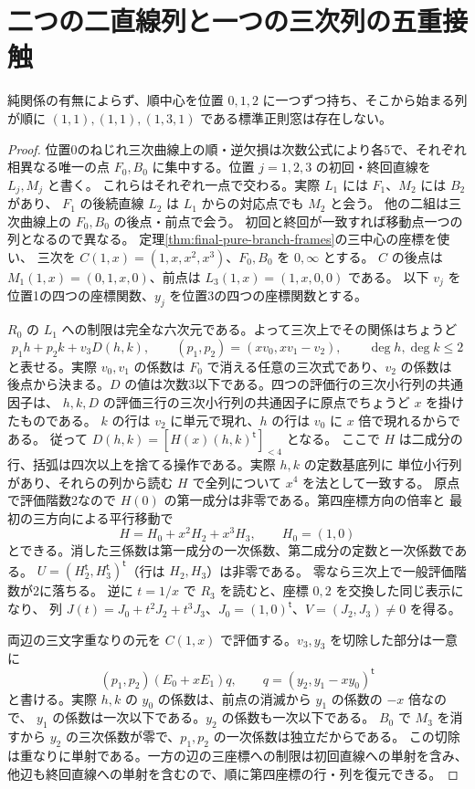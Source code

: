 \section{二つの二直線列と一つの三次列の五重接触}
\label{sec:cubic-corridor-jets}
\begin{theorem}\label{thm:cubic-corridor-jets}
純関係の有無によらず、順中心を位置 $0,1,2$ に一つずつ持ち、そこから始まる列が順に
$(1,1),(1,1),(1,3,1)$ である標準正則窓は存在しない。
\end{theorem}
\begin{proof}
位置0のねじれ三次曲線上の順・逆欠損は次数公式により各5で、それぞれ相異なる唯一の点
$F_0,B_0$ に集中する。位置 $j=1,2,3$ の初回・終回直線を $L_j,M_j$ と書く。
これらはそれぞれ一点で交わる。実際 $L_1$ には $F_1$、$M_2$ には $B_2$ があり、
$F_1$ の後続直線 $L_2$ は $L_1$ からの対応点でも $M_2$ と会う。
他の二組は三次曲線上の $F_0,B_0$ の後点・前点で会う。
初回と終回が一致すれば移動点一つの列となるので異なる。
定理\ref{thm:final-pure-branch-frames}の三中心の座標を使い、
三次を $C(1,x)=(1,x,x^2,x^3)$、$F_0,B_0$ を $0,\infty$ とする。
$C$ の後点は $M_1(1,x)=(0,1,x,0)$、前点は $L_3(1,x)=(1,x,0,0)$ である。
以下 $v_j$ を位置1の四つの座標関数、$y_j$ を位置3の四つの座標関数とする。

$R_0$ の $L_1$ への制限は完全な六次元である。よって三次上でその関係はちょうど
\[
 p_1h+p_2k+v_3D(h,k),\qquad
 (p_1,p_2)=(xv_0,xv_1-v_2),\qquad \deg h,\deg k\le2
\]
と表せる。実際 $v_0,v_1$ の係数は $F_0$ で消える任意の三次式であり、$v_2$ の係数は
後点から決まる。$D$ の値は次数3以下である。四つの評価行の三次小行列の共通因子は、
$h,k,D$ の評価三行の三次小行列の共通因子に原点でちょうど $x$ を掛けたものである。
$k$ の行は $v_2$ に単元で現れ、$h$ の行は $v_0$ に $x$ 倍で現れるからである。
従って $D(h,k)=[H(x)(h,k)^{\mathsf t}]_{<4}$ となる。
ここで $H$ は二成分の行、括弧は四次以上を捨てる操作である。実際 $h,k$ の定数基底列に
単位小行列があり、それらの列から読む $H$ で全列について $x^4$ を法として一致する。
原点で評価階数2なので $H(0)$ の第一成分は非零である。第四座標方向の倍率と
最初の三方向による平行移動で
\[
 H=H_0+x^2 H_2+x^3 H_3,\qquad H_0=(1,0)
\]
とできる。消した三係数は第一成分の一次係数、第二成分の定数と一次係数である。
$U=(H_2^{\mathsf t},H_3^{\mathsf t})^{\mathsf t}$（行は $H_2,H_3$）は非零である。
零なら三次上で一般評価階数が2に落ちる。
逆に $t=1/x$ で $R_3$ を読むと、座標 $0,2$ を交換した同じ表示になり、
列 $J(t)=J_0+t^2J_2+t^3J_3$、$J_0=(1,0)^{\mathsf t}$、$V=(J_2,J_3)\ne0$ を得る。

両辺の三文字重なりの元を $C(1,x)$ で評価する。$v_3,y_3$ を切除した部分は一意に
\[
 (p_1,p_2)(E_0+xE_1)q,\qquad q=(y_2,y_1-xy_0)^{\mathsf t}
\]
と書ける。実際 $h,k$ の $y_0$ の係数は、前点の消滅から $y_1$ の係数の $-x$ 倍なので、
$y_1$ の係数は一次以下である。$y_2$ の係数も一次以下である。
$B_0$ で $M_3$ を消すから $y_2$ の三次係数が零で、$p_1,p_2$ の一次係数は独立だからである。
この切除は重なりに単射である。一方の辺の三座標への制限は初回直線への単射を含み、
他辺も終回直線への単射を含むので、順に第四座標の行・列を復元できる。


\end{proof}

